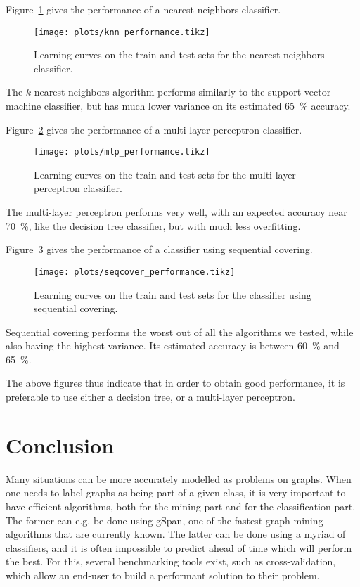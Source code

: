 \documentclass{sigkddExp}
\newcommand{\gspan}{\textsf{gSpan}}
\begin{document}
Figure~\ref{fig:knn_performance} gives the performance of a nearest neighbors classifier.
\begin{figure}[!hbtp]
	\centering
	\texttt{[image: plots/knn\_performance.tikz]}
	\caption{Learning curves on the train and test sets for the nearest neighbors classifier.}
	\label{fig:knn_performance}
\end{figure}
The \(k\)-nearest neighbors algorithm performs similarly to the support vector machine classifier, but has much lower variance on its estimated \SI{65}{\percent} accuracy.

Figure~\ref{fig:mlp_performance} gives the performance of a multi-layer perceptron classifier.
\begin{figure}[!hbtp]
	\centering
	\texttt{[image: plots/mlp\_performance.tikz]}
	\caption{Learning curves on the train and test sets for the multi-layer perceptron classifier.}
	\label{fig:mlp_performance}
\end{figure}
The multi-layer perceptron performs very well, with an expected accuracy near \SI{70}{\percent}, like the decision tree classifier, but with much less overfitting.

Figure~\ref{fig:sc_performance} gives the performance of a classifier using sequential covering.
\begin{figure}[!hbtp]
	\centering
	\texttt{[image: plots/seqcover\_performance.tikz]}
	\caption{Learning curves on the train and test sets for the classifier using sequential covering.}
	\label{fig:sc_performance}
\end{figure}
Sequential covering performs the worst out of all the algorithms we tested, while also having the highest variance.
Its estimated accuracy is between \SI{60}{\percent} and \SI{65}{\percent}.

The above figures thus indicate that in order to obtain good performance, it is preferable to use either a decision tree, or a multi-layer perceptron.

\section{Conclusion}
Many situations can be more accurately modelled as problems on graphs.
When one needs to label graphs as being part of a given class, it is very important to have efficient algorithms, both for the mining part and for the classification part.
The former can e.g. be done using \gspan, one of the fastest graph mining algorithms that are currently known.
The latter can be done using a myriad of classifiers, and it is often impossible to predict ahead of time which will perform the best.
For this, several benchmarking tools exist, such as cross-validation, which allow an end-user to build a performant solution to their problem.

\printbibliography
\end{document}
